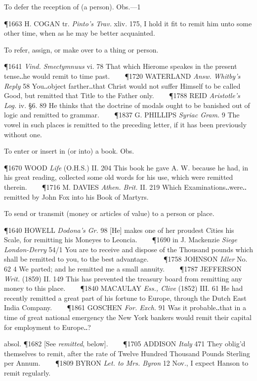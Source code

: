 \begin{description}[wide, labelwidth=!, labelindent=0pt]
\begin{myenumerate}
 To defer the reception of (a person). Obs.—1

\P 1663 H. COGAN tr. \textit{Pinto's Trav.} xliv. 175, I hold it fit to remit him unto some other time, when as he may be better acquainted.

 To refer, assign, or make over to a thing or person.

\P 1641 \textit{Vind.  Smectymnuus} vi. 78 That which Hierome speakes in the present tense‥he would remit to time past.    
\P 1720 WATERLAND  \textit{Answ. Whitby's Reply} 58 You‥object farther‥that Christ would not suffer Himself to be called Good, but remitted that Title to the Father only.    
\P 1788 REID  \textit{Aristotle's Log.} iv. §6. 89 He thinks that the doctrine of modals ought to be banished out of logic and remitted to grammar.    
\P 1837 G. PHILLIPS  \textit{Syriac Gram.} 9 The vowel in such places is remitted to the preceding letter, if it has been previously without one.

 To enter or insert in (or into) a book. Obs.

\P 1670 WOOD  \textit{Life} (O.H.S.) II. 204 This book he gave A. W. because he had, in his great reading, collected some old words for his use, which were remitted therein.    
\P 1716 M. DAVIES  \textit{Athen. Brit.} II. 219 Which Examinations‥were‥remitted by John Fox into his Book of Martyrs.

 To send or transmit (money or articles of value) to a person or place.

\P 1640 HOWELL  \textit{Dodona's Gr.} 98 [He] makes one of her proudest Cities his Scale, for remitting his Moneyes to Leoncia.    
\P 1690 in  J. Mackenzie \textit{Siege London-Derry} 54/1 You are to receive and dispose of the Thousand pounds which shall be remitted to you, to the best advantage.    
\P 1758 JOHNSON  \textit{Idler} No. 62 4 We parted; and he remitted me a small annuity.    
\P 1787 JEFFERSON  \textit{Writ.} (1859) II. 149 This has prevented the treasury board from remitting any money to this place.    
\P 1840 MACAULAY  \textit{Ess., Clive} (1852) III. 61 He had recently remitted a great part of his fortune to Europe, through the Dutch East India Company.    
\P 1861 GOSCHEN  \textit{For. Exch.} 91 Was it probable‥that in a time of great national emergency the New York bankers would remit their capital for employment to Europe‥?

absol. \P 1682 [See  \textit{remitted}, below].    
\P 1705 ADDISON  \textit{Italy} 471 They oblig'd themselves to remit, after the rate of Twelve Hundred Thousand Pounds Sterling per Annum.    
\P 1809 BYRON  \textit{Let. to Mrs. Byron} 12 Nov., I expect Hanson to remit regularly.


\end{myenumerate}
\end{description}
